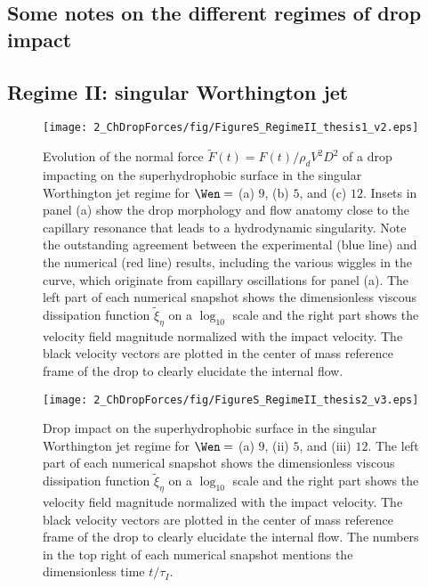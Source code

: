 \begin{subappendices}
	\section{Some notes on the different regimes of drop impact}
	\label{Ch2:SecNotes}
	
	\subsection{Regime II: singular Worthington jet}
	
	\begin{figure}
		\centering
		\texttt{[image: 2\_ChDropForces/fig/FigureS\_RegimeII\_thesis1\_v2.eps]}
		\caption{Evolution of the normal force $\tilde{F}(t) = F(t)/\rho_dV^2D^2$ of a drop impacting on the superhydrophobic surface in the singular Worthington jet regime for $\Wen =$ (a) $9$, (b) $5$, and (c) $12$. Insets in panel (a) show the drop morphology and flow anatomy close to the capillary resonance that leads to a hydrodynamic singularity. Note the outstanding agreement between the experimental (blue line) and the numerical (red line) results, including the various wiggles in the curve, which originate from capillary oscillations for panel (a). The left part of each numerical snapshot shows the dimensionless viscous dissipation function $\tilde{\xi}_\eta$ on a $\log_{10}$ scale and the right part shows the velocity field magnitude normalized with the impact velocity. The black velocity vectors are plotted in the center of mass reference frame of the drop to clearly elucidate the internal flow.}
		\label{Ch2:Fig_RegimeII}
	\end{figure}

	\begin{figure}
		\centering
		\texttt{[image: 2\_ChDropForces/fig/FigureS\_RegimeII\_thesis2\_v3.eps]}
		\caption{Drop impact on the superhydrophobic surface in the singular Worthington jet regime for $\Wen =$ (a) $9$, (ii) $5$, and (iii) $12$. The left part of each numerical snapshot shows the dimensionless viscous dissipation function $\tilde{\xi}_\eta$ on a $\log_{10}$ scale and the right part shows the velocity field magnitude normalized with the impact velocity. The black velocity vectors are plotted in the center of mass reference frame of the drop to clearly elucidate the internal flow. The numbers in the top right of each numerical snapshot mentions the dimensionless time $t/\tau_I$.}
		\label{Ch2:Fig_RegimeII_2}
	\end{figure}
	

\end{subappendices}
